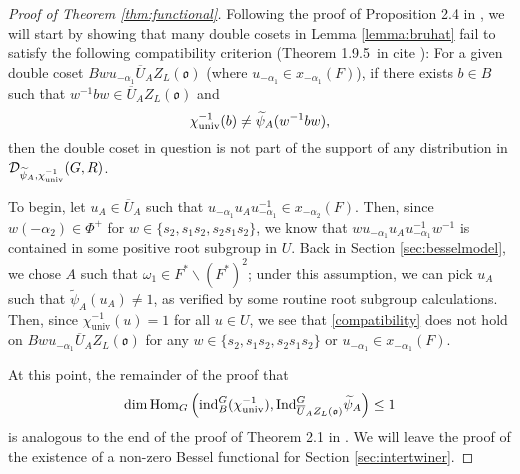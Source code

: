 \documentclass[11pt,letterpaper]{article}
\newcommand{\calD}{\mathcal{D}}
\newcommand{\bs}{\backslash}
\newcommand{\goth}{\mathfrak}
\newcommand{\calHom}{\textup{Hom}}
\newcommand{\Ind}{\textup{Ind}}
\newcommand{\ind}{\textup{ind}}
\theoremstyle{remark}
\numberwithin{equation}{section}
\begin{document}
\begin{proof}[Proof of Theorem \ref{thm:functional}]
Following the proof of Proposition 2.4 in \cite{FG}, we will start by showing that many double cosets in Lemma \ref{lemma:bruhat} fail to satisfy the following compatibility criterion (Theorem 1.9.5~in cite \cite{Sil}): For a given double coset $Bwu_{-\alpha_1}\overline{U}_AZ_L(\goth{o})$ (where $u_{-\alpha_1} \in x_{-\alpha_1}(F)$), if there exists $b \in B$ such that $w^{-1}bw \in \overline{U}_AZ_L(\goth{o})$ and \begin{equation}\label{compatibility} \chi_{\textup{univ}}^{-1}(b) \neq \widetilde{\psi}_A(w^{-1}bw),\end{equation} then the double coset in question is not part of the support of any distribution in $\calD_{\widetilde{\psi}_A,\chi_{\textup{univ}}^{-1}}(G,R)$. 

To begin, let $u_A \in \overline{U}_A$ such that $u_{-\alpha_1}u_Au_{-\alpha_1}^{-1} \in x_{-\alpha_2}(F)$. Then, since $w(-\alpha_2) \in \Phi^+$ for $w\in \{s_2, s_1s_2, s_2s_1s_2\}$, we know that $wu_{-\alpha_1}u_Au_{-\alpha_1}^{-1}w^{-1}$ is contained in some positive root subgroup in $U$. Back in Section \ref{sec:besselmodel}, we chose $A$ such that $\omega_1 \in F^{\ast}\bs (F^{\ast})^2$; under this assumption, we can pick $u_A$ such that $\widetilde{\psi}_A(u_A)\neq 1$, as verified by some routine root subgroup calculations. Then, since $\chi_{\text{univ}}^{-1}(u) = 1$ for all $u \in U$, we see that \eqref{compatibility} does not hold on $Bwu_{-\alpha_1}\overline{U}_AZ_L(\goth{o})$ for any $w \in \{s_2, s_1s_2, s_2s_1s_2\}$ or $u_{-\alpha_1} \in x_{-\alpha_1}(F)$.


At this point, the remainder of the proof that $$\dim \calHom_G\left(\ind_B^G(\chi_{\textup{univ}}^{-1}), \Ind_{\overline{U}_AZ_L(\goth{o})}^G \widetilde{\psi}_A\right) \leq 1$$ is analogous to the end of the proof of Theorem 2.1 in \cite{FG}. We will leave the proof of the existence of a non-zero Bessel functional for Section \ref{sec:intertwiner}.


\end{proof}
\end{document}
